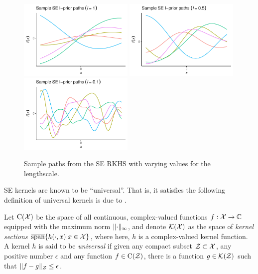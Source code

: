 \begin{figure}[hbt]
  \centering
  \includegraphics[width=0.49\textwidth]{figure/02-kernel_path_se_10}
  \includegraphics[width=0.49\textwidth]{figure/02-kernel_path_se_05}
  \includegraphics[width=0.49\textwidth]{figure/02-kernel_path_se_01}
  \caption{Sample paths from the SE RKHS with varying values for the lengthscale.}
\end{figure}

SE kernels are known to be ``universal''. That is, it satisfies the following definition of universal kernels is due to \citet{micchelli2006universal}.

\begin{definition}
  Let $\text{C}({\mathcal X})$ be the space of all continuous, complex-valued functions $f:{\mathcal X}\to\mathbb{C}$ equipped with the maximum norm $\lVert\cdot\rVert_\infty$, and denote ${\mathcal K}({\mathcal X})$ as the space of \emph{kernel sections} $ \overline{\text{span}}\{ h(\cdot,x) | x \in {\mathcal X} \}$, where here, $h$ is a complex-valued kernel function.
  A kernel $h$ is said to be \emph{universal} if given any compact subset ${\mathcal Z} \subset {\mathcal X}$, any positive number $\epsilon$ and any function $f \in \text{C}({\mathcal Z})$, there is a function $g \in {\mathcal K}({\mathcal Z})$ such that $\lVert f-g\rVert_{\mathcal Z} \leq \epsilon$.
\end{definition}

